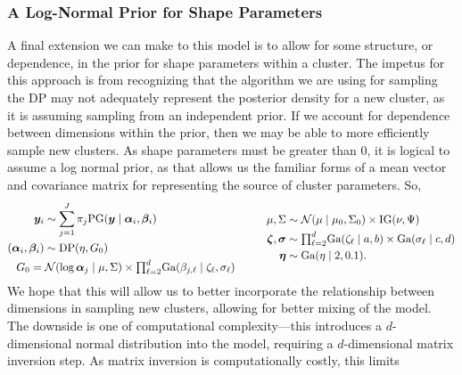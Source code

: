 \subsubsection{A Log-Normal Prior for Shape Parameters}
A final extension we can make to this model is to allow for some structure, or dependence, in the prior
  for shape parameters within a cluster.  The impetus for this approach is from recognizing that the
  algorithm we are using for sampling the DP may not adequately represent the posterior density for
  a new cluster, as it is assuming sampling from an independent prior.  If we account for dependence
  between dimensions within the prior, then we may be able to more efficiently sample new clusters.
  As shape parameters must be greater than 0, it is logical to assume a log normal prior, as that
  allows us the familiar forms of a mean vector and covariance matrix for representing the source of
  cluster parameters. So,
  \begin{equation}
    \label{eqn:dpln}
    \begin{aligned}
      \bm{ y}_i &\sim \sum_{j = 1}^J\pi_j\text{PG}\left(\bm{ y}\mid \bm{ \alpha}_i, \bm{\beta}_i\right)\\
      (\bm{\alpha}_i, \bm{\beta}_i) &\sim \text{DP}\left(\eta, G_0\right)\\
        &~\hspace{-1cm}G_0 = \mathcal{N}\left(\log\bm{ \alpha}_{j}\mid\mu,\Sigma\right)\times
            {\textstyle\prod}_{\ell = 2}^d\text{Ga}\left(\beta_{j,\ell}\mid\zeta_{\ell},\sigma_{\ell}\right)
    \end{aligned}
    \hspace{1cm}
    \begin{aligned}
      \mu,\Sigma &\sim \mathcal{N}\left(\mu\mid\mu_0,\Sigma_0\right) \times \text{IG}\left(\nu,\Psi\right)\\
      \bm{ \zeta},\bm{\sigma} &\sim {\textstyle\prod}_{\ell = 2}^d\text{Ga}(\zeta_{\ell} \mid a,b) \times \text{Ga}(\sigma_{\ell} \mid c,d) \\
      \bm{ \eta} &\sim \text{Ga}(\eta \mid 2, 0.1).
    \end{aligned}
  \end{equation}
  We hope that this will allow us to better incorporate the relationship between dimensions in
  sampling new clusters, allowing for better mixing of the model.  The downside is one of computational
  complexity---this introduces a $d$-dimensional normal distribution into the model, requiring a
  $d$-dimensional matrix inversion step.  As matrix inversion is computationally costly, this limits
